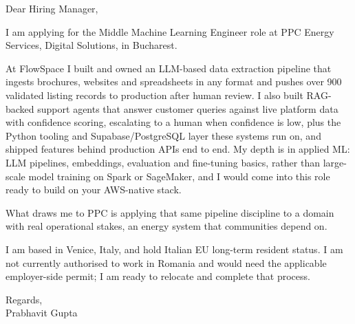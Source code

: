 \documentclass[a4paper,11pt]{article}
\begin{document}
Dear Hiring Manager,

I am applying for the Middle Machine Learning Engineer role at PPC Energy Services, Digital Solutions, in Bucharest.

At FlowSpace I built and owned an LLM-based data extraction pipeline that ingests brochures, websites and spreadsheets in any format and pushes over 900 validated listing records to production after human review. I also built RAG-backed support agents that answer customer queries against live platform data with confidence scoring, escalating to a human when confidence is low, plus the Python tooling and Supabase/PostgreSQL layer these systems run on, and shipped features behind production APIs end to end. My depth is in applied ML: LLM pipelines, embeddings, evaluation and fine-tuning basics, rather than large-scale model training on Spark or SageMaker, and I would come into this role ready to build on your AWS-native stack.

What draws me to PPC is applying that same pipeline discipline to a domain with real operational stakes, an energy system that communities depend on.

I am based in Venice, Italy, and hold Italian EU long-term resident status. I am not currently authorised to work in Romania and would need the applicable employer-side permit; I am ready to relocate and complete that process.

Regards,\\
Prabhavit Gupta
\end{document}

